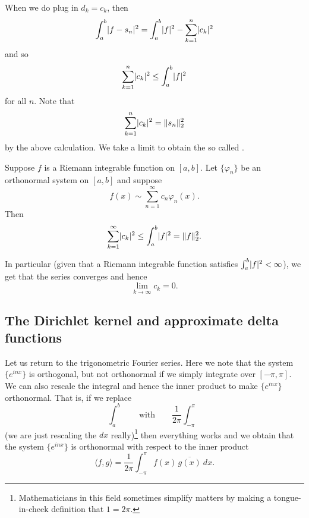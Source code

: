 When we do plug in $d_k = c_k$, then
\begin{equation*}
\int_a^b \lvert {f-s_n} \rvert^2
=
\int_a^b \lvert {f} \rvert^2
-
\sum_{k=1}^n \lvert {c_k} \rvert^2
\end{equation*}
and so
\begin{equation*}
\sum_{k=1}^n \lvert {c_k} \rvert^2
\leq
\int_a^b \lvert {f} \rvert^2
\end{equation*}
for all $n$.  Note that
\begin{equation*}
\sum_{k=1}^n \lvert {c_k} \rvert^2 = \lVert {s_n} \rVert_2^2
\end{equation*}
by the above calculation.
We take a limit to obtain the so called
\emph{}.

\begin{thm} \label{thm:bessels}
Suppose $f$ is a Riemann integrable function on $[a,b]$.
Let $\{ \varphi_n \}$ be an orthonormal system on $[a,b]$ and
suppose
\begin{equation*}
f(x) \sim \sum_{n=1}^\infty c_n \varphi_n(x) .
\end{equation*}
Then
\begin{equation*}
\sum_{k=1}^\infty \lvert {c_k} \rvert^2
\leq
\int_a^b \lvert {f} \rvert^2
= \lVert {f} \rVert_2^2 .
\end{equation*}
\end{thm}

In particular (given that a Riemann integrable function satisfies
$\int_a^b \lvert {f} \rvert^2 < \infty$), we get that the series
converges and hence
\begin{equation*}
\lim_{k \to \infty} c_k = 0 .
\end{equation*}

\subsection{The Dirichlet kernel and approximate delta functions}

Let us return to the trigonometric Fourier series.  Here we note that the
system $\{ e^{inx} \}$ is orthogonal, but not orthonormal if we simply
integrate over $[-\pi,\pi]$.  We can also rescale the integral
and hence the inner product to make 
$\{ e^{inx} \}$ orthonormal.  That is, if we replace
\begin{equation*}
\int_a^b \qquad \text{with} \qquad
\frac{1}{2\pi} \int_{-\pi}^\pi
\end{equation*}
(we are just rescaling the $dx$ really)\footnote{%
Mathematicians in this field sometimes simplify matters by
making a tongue-in-cheek definition that $1=2\pi$.}
then everything works and we obtain that the system $\{ e^{inx} \}$
is orthonormal with respect to the inner product
\begin{equation*}
\langle f , g \rangle =
\frac{1}{2\pi} \int_{-\pi}^\pi f(x) \, \overline{g(x)} ~ dx .
\end{equation*}

